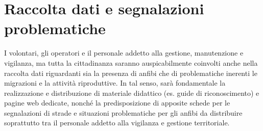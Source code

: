 \documentclass[11pt,a4paper,twoside]{memoir}
\begin{document}
\section{Raccolta dati e segnalazioni problematiche}
I volontari, gli operatori e il personale addetto alla gestione, manutenzione e vigilanza, ma tutta la cittadinanza saranno auspicabilmente coinvolti anche nella raccolta dati riguardanti sia la presenza di anfibi che di problematiche inerenti le migrazioni e la attività riproduttive. In tal senso, sarà fondamentale la realizzazione e distribuzione di materiale didattico (es. guide di riconoscimento) e pagine web dedicate, nonché la predisposizione di apposite schede per le segnalazioni di strade e situazioni problematiche per gli anfibi da distribuire soprattutto tra il personale addetto alla vigilanza e gestione territoriale.
\end{document}
